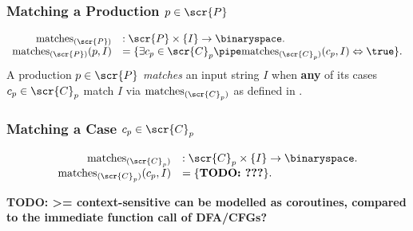 \documentclass[10pt]{article}
\newcommand{\generalsubseq}{\overbar{I}}
\begin{document}
\subsubsection{Matching a Production $p \in \scr{P}$}
\label{sec:matching-a-production-p}
\begin{equation}
  \label{eq:matches-prod}
  \begin{array}{rl}
    \text{matches}_{(\scr{P})} &: \scr{P} \times \{I\} \rightarrow \binaryspace. \\
    \text{matches}_{(\scr{P})}(p, I) &= \{ \exists c_p \in \scr{C}_p \pipe \text{matches}_{(\scr{C}_p)}(c_p, I) \Leftrightarrow \true \}.
  \end{array}
\end{equation}
A production $p \in \scr{P}$ \textit{matches} an input string $I$ when \textbf{any} of its cases $c_p \in \scr{C}_p$ match $I$ via $\text{matches}_{(\scr{C}_p)}$ as defined in .

\subsubsection{Matching a Case $c_p \in \scr{C}_p$}
\label{sec:matching-a-case-cp-in-scrcp}
\begin{equation}
  \label{eq:matches-case}
  \begin{array}{rl}
    \text{matches}_{(\scr{C}_p)} &: \scr{C}_p \times \{I\} \rightarrow \binaryspace. \\
    \text{matches}_{(\scr{C}_p)}(c_p, I) &= \{ \text{\textbf{TODO: ???}} \}.
  \end{array}
\end{equation}

\textbf{TODO: >= context-sensitive can be modelled as coroutines, compared to the immediate function call of DFA/CFGs?}
\end{document}
